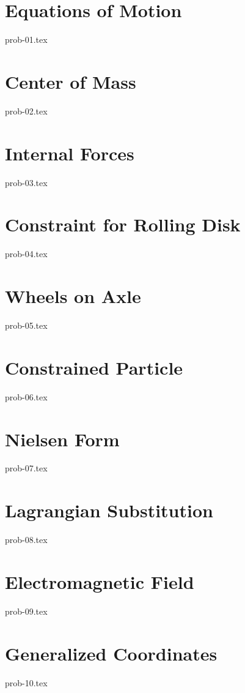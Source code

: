 \section{Equations of Motion}

{prob-01.tex}

\section{Center of Mass}

{prob-02.tex}

\section{Internal Forces}

{prob-03.tex}

\section{Constraint for Rolling Disk}\label{rollingdisk}

{prob-04.tex}

\section{Wheels on Axle}

{prob-05.tex}

\section{Constrained Particle}

{prob-06.tex}

\section{Nielsen Form}\label{nielsen}

{prob-07.tex}

\section{Lagrangian Substitution}\label{lagrangeinv}

{prob-08.tex}

\section{Electromagnetic Field}

{prob-09.tex}

\section{Generalized Coordinates}

{prob-10.tex}

